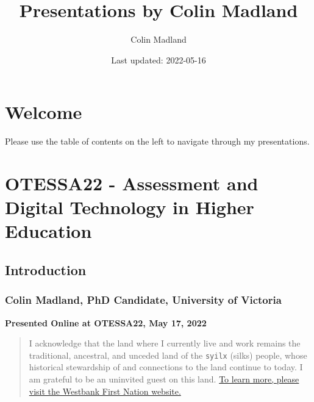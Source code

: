 \documentclass[
]{book}
\title{Presentations by Colin Madland}
\author{Colin Madland}
\date{Last updated: 2022-05-16}
\begin{document}
\maketitle

{
\setcounter{tocdepth}{1}
\tableofcontents
}
\hypertarget{welcome}{%
\chapter*{Welcome}\label{welcome}}

Please use the table of contents on the left to navigate through my presentations.

\hypertarget{otessa22---assessment-and-digital-technology-in-higher-education}{%
\chapter*{OTESSA22 - Assessment and Digital Technology in Higher Education}\label{otessa22---assessment-and-digital-technology-in-higher-education}}

\hypertarget{introduction}{%
\section*{Introduction}\label{introduction}}

\hypertarget{colin-madland-phd-candidate-university-of-victoria}{%
\subsection*{Colin Madland, PhD Candidate, University of Victoria}\label{colin-madland-phd-candidate-university-of-victoria}}

\textbf{Presented Online at OTESSA22, May 17, 2022}

\begin{quote}
I acknowledge that the land where I currently live and work remains the traditional, ancestral, and unceded land of the \texttt{syilx} (silks) people, whose historical stewardship of and connections to the land continue to today. I am grateful to be an uninvited guest on this land. \href{https://wfn.ca}{To learn more, please visit the Westbank First Nation website.}
\end{quote}
\end{document}
